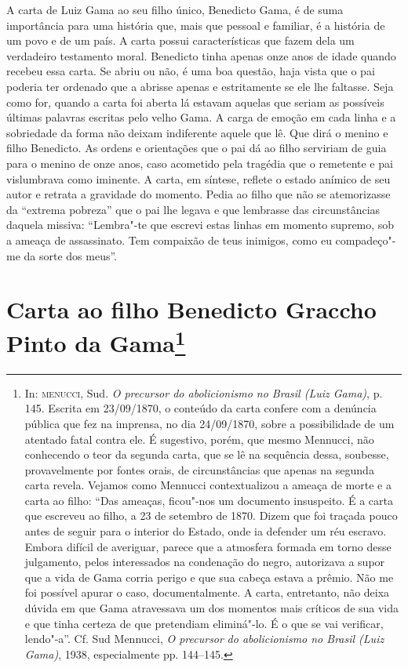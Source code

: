 \paginabranca
\mbox{}\vfill
\thispagestyle{empty}

{\small\noindent
A carta de Luiz Gama ao seu filho único, Benedicto Gama, é de suma
importância para uma história que, mais que pessoal e familiar, é a
história de um povo e de um país. A carta possui características que
fazem dela um verdadeiro testamento moral. Benedicto tinha apenas onze
anos de idade quando recebeu essa carta. Se abriu ou não, é uma boa
questão, haja vista que o pai poderia ter
ordenado que a abrisse apenas e estritamente se ele lhe faltasse. Seja
como for, quando a carta foi aberta lá estavam aquelas que seriam as
possíveis últimas palavras escritas pelo velho Gama. A carga de emoção
em cada linha e a sobriedade da forma não deixam indiferente aquele que
lê. Que dirá o menino e filho Benedicto. As ordens e orientações que o
pai dá ao filho serviriam de guia para o
menino de onze anos, caso acometido pela tragédia que o remetente e pai
vislumbrava como iminente. A carta, em síntese, reflete o estado anímico
de seu autor e retrata a gravidade do momento. Pedia ao filho que não se
atemorizasse da ``extrema pobreza'' que o pai lhe legava e que lembrasse
das circunstâncias daquela missiva: ``Lembra"-te que escrevi estas linhas
em momento supremo, sob a ameaça de assassinato. Tem compaixão de teus
inimigos, como eu compadeço"-me da sorte dos meus''.}

\chapter{Carta ao filho Benedicto Graccho Pinto da Gama\footnote[*]{
  In: \textsc{menucci}, Sud. \emph{O precursor do abolicionismo no Brasil (Luiz
  Gama)}, p. 145. Escrita em 23/09/1870, o conteúdo da carta confere com
  a denúncia pública que fez na imprensa, no dia 24/09/1870, sobre a
  possibilidade de um atentado fatal contra ele. É sugestivo, porém, que
  mesmo Mennucci, não conhecendo o teor da segunda carta, que se lê na
  sequência dessa, soubesse, provavelmente por fontes orais, de
  circunstâncias que apenas na segunda carta revela. Vejamos como
  Mennucci contextualizou a ameaça de morte e a carta ao filho: ``Das
  ameaças, ficou"-nos um documento insuspeito. É a carta que escreveu ao
  filho, a 23 de setembro de 1870. Dizem que foi traçada pouco antes de
  seguir para o interior do Estado, onde ia defender um réu escravo.
  Embora difícil de averiguar, parece que a atmosfera formada em torno
  desse julgamento, pelos interessados na condenação do negro,
  autorizava a supor que a vida de Gama corria perigo e que sua cabeça
  estava a prêmio. Não me foi possível apurar o caso, documentalmente. A
  carta, entretanto, não deixa dúvida em que Gama atravessava um dos
  momentos mais críticos de sua vida e que tinha certeza de que
  pretendiam eliminá"-lo. É o que se vai verificar, lendo"-a''. Cf. Sud
  Mennucci, \emph{O precursor} \emph{do abolicionismo no Brasil (Luiz
  Gama)}, 1938, especialmente pp. 144--145.}}

